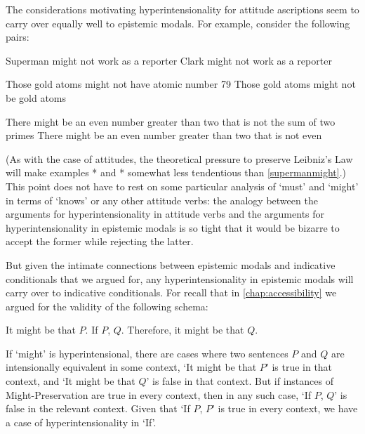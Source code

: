 \documentclass[If.tex]{subfiles}
\begin{document}
The considerations motivating hyperintensionality for attitude ascriptions seem to carry over equally well to epistemic modals.  For example, consider the following pairs:
\begin{prop}
	\nitem \label{supermanmight}
	\begin{prop}
		\aitem
		Superman might not work as a reporter
		\aitem
		Clark might not work as a reporter
	\end{prop}
	\nitem
	\begin{prop}
		\aitem
		Those gold atoms might not have atomic number 79
		\aitem
		Those gold atoms might not be gold atoms
	\end{prop}
	\nitem
	\begin{prop}
		\aitem
		There might be an even number greater than two that is not the sum of two primes
		\aitem
		There might be an even number greater than two that is not even
	\end{prop}
\end{prop}
(As with the case of attitudes, the theoretical pressure to preserve Leibniz's Law will make examples * and * somewhat less tendentious than \ref{supermanmight}.)  This point does not have to rest on some particular analysis of ‘must’ and ‘might’ in terms of ‘knows’ or any other attitude verbs: the analogy between the arguments for hyperintensionality in attitude verbs and the arguments for hyperintensionality in epistemic modals is so tight that it would be bizarre to accept the former while rejecting the latter.  

But given the intimate connections between epistemic modals and indicative conditionals that we argued for, any hyperintensionality in epistemic modals will carry over to indicative conditionals.  For recall that in \autoref{chap:accessibility} we argued for the validity of the following schema:
\begin{prop}
	It might be that $P$.  If $P$, $Q$.  Therefore, it might be that $Q$. 
\end{prop}
If ‘might’ is hyperintensional, there are cases where two sentences $P$ and $Q$ are intensionally equivalent in some context, ‘It might be that $P$’ is true in that context, and ‘It might be that $Q$’ is false in that context.  But if instances of Might-Preservation are true in every context, then in any such case, ‘If $P$, $Q$’ is false in the relevant context.  Given that ‘If $P$, $P$’ is true in every context, we have a case of hyperintensionality in ‘If’.  

\end{document}
